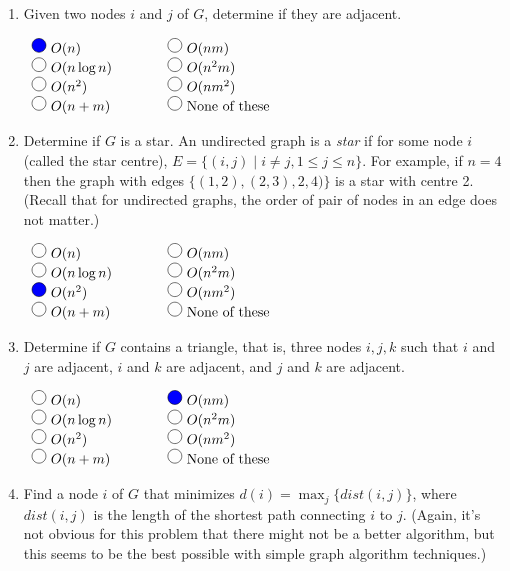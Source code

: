 \documentclass[11pt]{article}
\newcommand{\fillinMC}[1]{\fillinMCmath{\mbox{#1}}}
\newcommand{\fillinMCmath}[1]{\begin{tikzpicture}\draw circle [radius=0.5em];\end{tikzpicture}\ #1}
\newcommand{\fillinMCmathsoln}[1]{\begin{tikzpicture}\draw[black, fill=blue] circle [radius=0.5em];\end{tikzpicture}\ #1}
\begin{document}
\begin{enumerate}
\item Given two nodes $i$ and $j$ of $G$, determine if they are adjacent.

$\begin{array}{lcl}
\fillinMCmathsoln{O(n)} & \qquad & \fillinMCmath{O(nm)} \\
\fillinMCmath{O(n\log n)} & \qquad & \fillinMCmath{O(n^2m)}\\
\fillinMCmath{O(n^2)} & \qquad & \fillinMCmath{O(nm^2)}\\
\fillinMCmath{O(n+m)} & \qquad & \fillinMC{None of these}
\end{array}$

\item Determine if $G$ is a star. An undirected graph is a \emph{star} if
for some node $i$ (called the star
centre), $E = \{(i,j) \;|\; i \neq j, 1\le j \le n\}$.  For example,
if $n=4$ then the graph with edges $\{(1,2), (2,3), 2,4)\}$ is a star
with centre 2. (Recall that for undirected graphs, the order of 
pair of nodes in an edge does not matter.)

$\begin{array}{lcl}
\fillinMCmath{O(n)} & \qquad & \fillinMCmath{O(nm)} \\
\fillinMCmath{O(n\log n)} & \qquad & \fillinMCmath{O(n^2m)}\\
\fillinMCmathsoln{O(n^2)} & \qquad & \fillinMCmath{O(nm^2)}\\
\fillinMCmath{O(n+m)} & \qquad & \fillinMC{None of these}
\end{array}$

\item Determine if $G$ contains a triangle, that is, three
nodes $i,j,k$ such that $i$ and $j$ are adjacent,
$i$ and $k$ are adjacent, and $j$ and $k$ are adjacent.

$\begin{array}{lcl}
\fillinMCmath{O(n)} & \qquad & \fillinMCmathsoln{O(nm)} \\
\fillinMCmath{O(n\log n)} & \qquad & \fillinMCmath{O(n^2m)}\\
\fillinMCmath{O(n^2)} & \qquad & \fillinMCmath{O(nm^2)}\\
\fillinMCmath{O(n+m)} & \qquad & \fillinMC{None of these}
\end{array}$

\item Find a node $i$ of $G$ that minimizes $d(i) = \max_j \{
      \textit{dist}(i, j) \}$, where $\textit{dist}(i,j)$ is the
length of the shortest path connecting $i$ to $j$. (Again, it's
not obvious for this problem that there might not be a better
algorithm, but this seems to be the best possible with simple
graph algorithm techniques.)


\end{enumerate}
\end{document}
